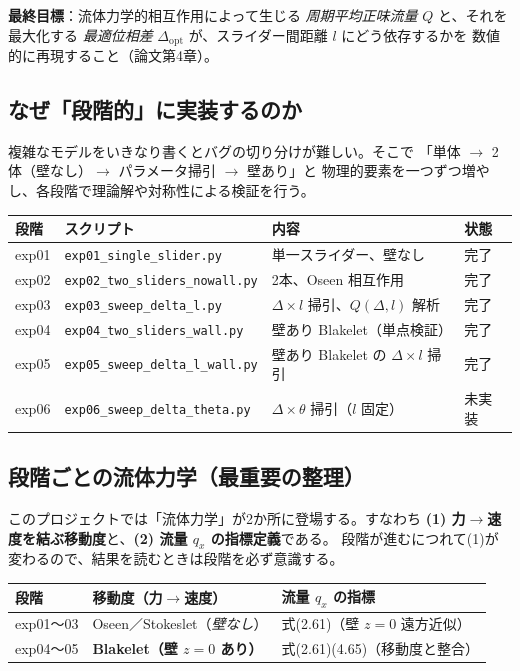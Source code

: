 \documentclass[11pt,a4paper]{article}
\newcommand{\Dopt}{\Delta_{\mathrm{opt}}}
\begin{document}
\begin{keybox}
\textbf{最終目標}：流体力学的相互作用によって生じる
\emph{周期平均正味流量} $Q$ と、それを最大化する
\emph{最適位相差} $\Dopt$ が、スライダー間距離 $l$ にどう依存するかを
数値的に再現すること（論文第4章）。
\end{keybox}

\subsection{なぜ「段階的」に実装するのか}

複雑なモデルをいきなり書くとバグの切り分けが難しい。そこで
「単体 $\to$ 2体（壁なし）$\to$ パラメータ掃引 $\to$ 壁あり」と
物理的要素を一つずつ増やし、各段階で理論解や対称性による検証を行う。

\begin{table}[h]
\centering\small
\begin{tabularx}{\linewidth}{l l X l}
\toprule
段階 & スクリプト & 内容 & 状態 \\
\midrule
exp01 & \texttt{exp01\_single\_slider.py} & 単一スライダー、壁なし & 完了 \\
exp02 & \texttt{exp02\_two\_sliders\_nowall.py} & 2本、Oseen 相互作用 & 完了 \\
exp03 & \texttt{exp03\_sweep\_delta\_l.py} & $\Delta\times l$ 掃引、$Q(\Delta,l)$ 解析 & 完了 \\
exp04 & \texttt{exp04\_two\_sliders\_wall.py} & 壁あり Blakelet（単点検証） & 完了 \\
exp05 & \texttt{exp05\_sweep\_delta\_l\_wall.py} & 壁あり Blakelet の $\Delta\times l$ 掃引 & 完了 \\
exp06 & \texttt{exp06\_sweep\_delta\_theta.py} & $\Delta\times\theta$ 掃引（$l$ 固定） & 未実装 \\
\bottomrule
\end{tabularx}
\end{table}

\subsection{段階ごとの流体力学（最重要の整理）}

このプロジェクトでは「流体力学」が2か所に登場する。すなわち
\textbf{(1) 力$\to$速度を結ぶ移動度}と、\textbf{(2) 流量 $q_x$ の指標定義}である。
段階が進むにつれて(1)が変わるので、結果を読むときは段階を必ず意識する。

\begin{table}[h]
\centering\small
\begin{tabularx}{\linewidth}{l X X}
\toprule
段階 & 移動度（力$\to$速度） & 流量 $q_x$ の指標 \\
\midrule
exp01〜03 & Oseen／Stokeslet（\emph{壁なし}） & 式(2.61)（壁 $z=0$ 遠方近似） \\
exp04〜05 & \textbf{Blakelet（壁 $z=0$ あり）} & 式(2.61)(4.65)（移動度と整合） \\
\bottomrule
\end{tabularx}
\end{table}
\end{document}
